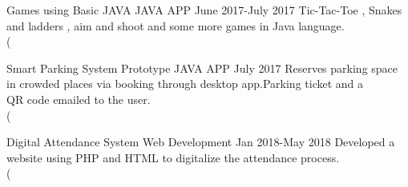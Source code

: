    
\begin{entryzlist}

\entryz

{Games using Basic JAVA {\normalfont JAVA APP }}
{June 2017-July 2017}
{\small Tic-Tac-Toe , Snakes and ladders , aim and shoot and some more games in Java language.
\\
(}

\entryz

{Smart Parking System Prototype {\normalfont JAVA APP }}
{July 2017}
{\small Reserves parking space in crowded places via booking through desktop app.Parking ticket and a 
\\
QR code emailed to the user.
\\
(}
\entryz

{Digital Attendance System {\normalfont Web Development }}
{Jan 2018-May 2018}
{\small Developed a website using PHP and HTML to digitalize the attendance process. 
\\
(}


\end{entryzlist}
